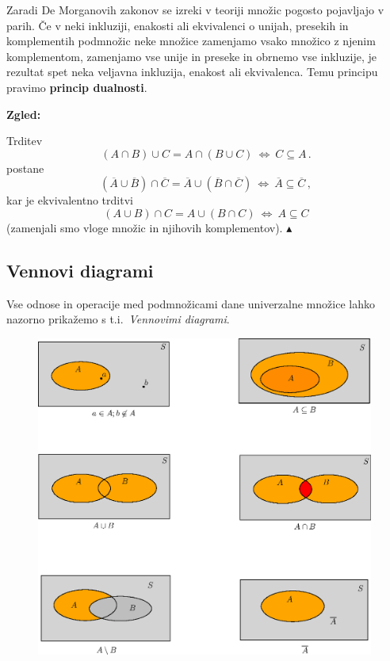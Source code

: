 \documentclass[11pt,paper=b5,footinclude,headinclude]{scrbook} %
\def\cee {{~\Leftrightarrow~}}
\def\zgled{\noindent\textbf{\color{blue} Zgled: }}
\def\kz{{\hfill{\color{blue}$\blacktriangle$}}}%
\begin{document}
Zaradi De Morganovih zakonov se izreki v teoriji množic pogosto pojavljajo v parih.
Če v neki inkluziji, enakosti ali ekvivalenci o unijah, presekih in komplementih podmnožic neke množice zamenjamo vsako množico z njenim komplementom,
zamenjamo vse unije in preseke in obrnemo vse inkluzije, je rezultat spet neka veljavna inkluzija, enakost ali ekvivalenca. Temu principu pravimo \textbf{ princip dualnosti}.


\bigskip
\zgled

Trditev
$$(A\cap B)\cup C = A\cap (B\cup C) \cee C\subseteq A\,.$$
postane
$$(\overline A\cup \overline B)\cap \overline C = \overline A\cup (\overline B\cap \overline C) \cee \overline A\subseteq \overline C\,,$$
kar je ekvivalentno trditvi
$$(A\cup B)\cap C = A\cup (B\cap C) \cee A\subseteq C$$
(zamenjali smo vloge množic in njihovih komplementov).
\kz

\subsection{Vennovi diagrami}

Vse odnose in operacije med podmnožicami dane univerzalne množice lahko nazorno prikažemo s t.i.~{\em Vennovimi diagrami}.

\begin{figure}[ht]
\begin{center}
\includegraphics[width=111mm]{Venn.eps}
\end{center}
\end{figure}
\end{document}
